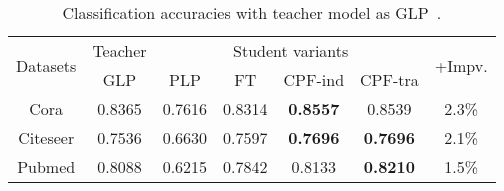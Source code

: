 \documentclass[sigconf]{acmart}
\begin{document}
\begin{table}[htb]
\centering
\caption{Classification accuracies with teacher model as GLP~\cite{li2019label}. }
\label{tab:acc4}
\resizebox{0.98\columnwidth}{!}
	{
\begin{tabular}{|c|c|c|c|c|c|c|}
\hline
\multirow{2}{*}{Datasets} & Teacher & \multicolumn{4}{c|}{Student variants}               & \multirow{2}{*}{+Impv.} \\ \cline{2-6}
                          & GLP     & PLP    & FT     & CPF-ind         & CPF-tra         &                         \\ \hline
Cora                      & 0.8365  & 0.7616 & 0.8314 & \textbf{0.8557} & 0.8539          & 2.3\%                   \\ \hline
Citeseer                  & 0.7536  & 0.6630 & 0.7597 & \textbf{0.7696} & \textbf{0.7696} & 2.1\%                   \\ \hline
Pubmed                    & 0.8088  & 0.6215 & 0.7842 & 0.8133          & \textbf{0.8210} & 1.5\%                   \\ \hline
\end{tabular}}
\end{table}
\end{document}
